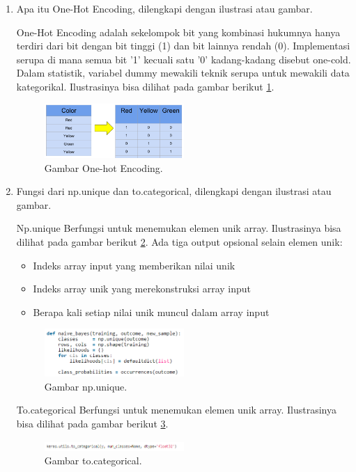 \begin{enumerate}
\item Apa itu One-Hot Encoding, dilengkapi dengan ilustrasi atau gambar.
\par One-Hot Encoding adalah sekelompok bit yang kombinasi hukumnya hanya terdiri dari bit dengan bit tinggi (1) dan bit lainnya rendah (0). Implementasi serupa di mana semua bit '1' kecuali satu '0' kadang-kadang disebut one-cold. Dalam statistik, variabel dummy mewakili teknik serupa untuk mewakili data kategorikal.  Ilustrasinya bisa dilihat pada gambar berikut  \ref{no6}.
	\begin{figure}[ht]
	\centerline{\includegraphics[width=0.5\textwidth]{figures/chapter6/no6.png}}
	\caption{Gambar One-hot Encoding.}
	\label{no6}
	\end{figure}

\item Fungsi dari np.unique dan to.categorical, dilengkapi dengan ilustrasi atau gambar.
\par Np.unique Berfungsi untuk menemukan elemen unik array.  Ilustrasinya bisa dilihat pada gambar berikut  \ref{no7a}.
Ada tiga output opsional selain elemen unik:
	\begin{itemize}
	\item Indeks array input yang memberikan nilai unik
	\item Indeks array unik yang merekonstruksi array input
	\item Berapa kali setiap nilai unik muncul dalam array input
	\end{itemize}
		\begin{figure}[ht]
		\centerline{\includegraphics[width=0.5\textwidth]{figures/chapter6/no7a.png}}
		\caption{Gambar np.unique.}
		\label{no7a}
		\end{figure}

\par To.categorical Berfungsi untuk menemukan elemen unik array.  Ilustrasinya bisa dilihat pada gambar berikut  \ref{no7b}.
	\begin{figure}[ht]
	\centerline{\includegraphics[width=0.5\textwidth]{figures/chapter6/no7b.png}}
	\caption{Gambar to.categorical.}
	\label{no7b}
	\end{figure}


\end{enumerate}
